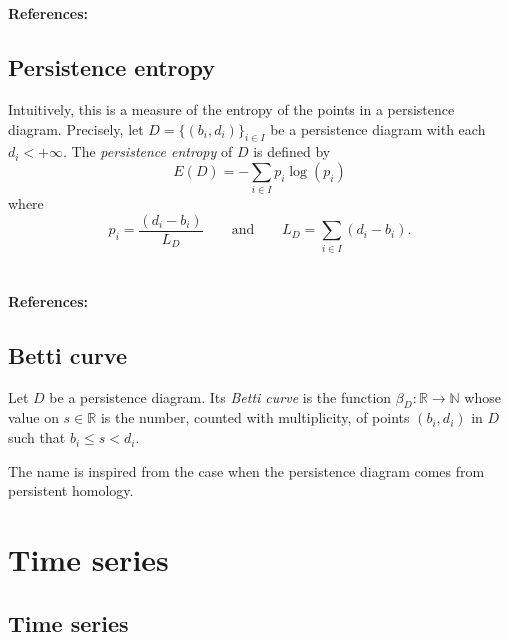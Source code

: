 \documentclass{amsart}
\begin{document}
	\paragraph{\\ References:} \cite{chazal2014stochastic}
	
	\subsection*{Persistence entropy} \label{persistence_entropy}
	
	Intuitively, this is a measure of the entropy of the points in a
	persistence diagram. Precisely, let $D = \{(b_i, d_i)\}_{i \in I}$ be a persistence diagram with each $d_i < +\infty$. The \textit{persistence entropy} of $D$ is defined by
	\begin{equation*}
	E(D) = - \sum_{i \in I} p_i \log(p_i)
	\end{equation*}
	where
	\begin{equation*}
	p_i = \frac{(d_i - b_i)}{L_D} \qquad \text{and} \qquad L_D = \sum_{i \in I} (d_i - b_i) . 
	\end{equation*}
	
	\paragraph{\\ References:} \cite{rucco2016characterisation}
	
	\subsection*{Betti curve} \label{betti_curve}
	
	Let $D$ be a 
	persistence diagram. Its \textit{Betti curve} is the function $\beta_D : \mathbb R \to \mathbb N$ whose value on $s \in \mathbb R$ is the number, counted with multiplicity, of points $(b_i,d_i)$ in $D$ such that $b_i \leq s <d_i$.
	
	The name is inspired from the case when the persistence diagram comes from persistent homology.
	
	\section{Time series}
	
	\subsection*{Time series} \label{time_series}
	
\end{document}
